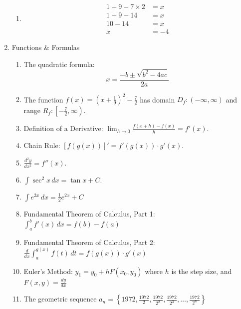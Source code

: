 \documentclass[a4paper,14pt]{article}
\begin{document}
\begin{enumerate}
\begin{enumerate}
        \item
        \begin{align}
            1 + 9 - 7 \times 2 &= x \tag{1}\\
            1 + 9 - 14 &= x \tag{2}\\
            10 - 14 &= x \tag{3}\\
            x &= -4 \tag{4}
        \end{align}
    \end{enumerate}

    \item Functions \& Formulas
    \begin{enumerate}
        \item The quadratic formula: \[x = \frac{-b \pm \sqrt{b^2 - 4ac}}{2a}\]
        
        \item The function \( f(x) = \left( x + \frac{1}{9} \right)^2 - \frac{7}{2} \) has domain \( D_f : (-\infty, \infty) \) and range \( R_f : \left[ -\frac{7}{2}, \infty \right) \).
        
        \item Definition of a Derivative: \( \lim_{h \to 0} \frac{f(x+h) - f(x)}{h} = f'(x) \).

        \item Chain Rule: \( [f(g(x))]' = f'(g(x)) \cdot g'(x) \).

        \item \(\frac{d^2 y}{dx^2} = f''(x) \).
        
        \item \(\int \sec^2 x \, dx = \tan x + C\).

        \item $\int e^{2x} \, dx = \frac{1}{2}e^{2x} + C$
        
        \item Fundamental Theorem of Calculus, Part 1: $\int_a^b f'(x) \, dx = f(b) - f(a)$
        
        \item Fundamental Theorem of Calculus, Part 2: $\frac{d}{dx} \int_a^{g(x)} f(t) \, dt = f(g(x)) \cdot g'(x)$
        
        \item Euler’s Method: $y_1 = y_0 + hF(x_0, y_0) $ where $h$ is the step size, and $F(x, y) = \frac{dy}{dx}$
        
        \item The geometric sequence $a_n = \left\{1972, \frac{1972}{2}, \frac{1972}{2^2}, \frac{1972}{2^3}, \dots, \frac{1972}{2^n} \right\}$
        

\end{enumerate}
\end{enumerate}
\end{document}
